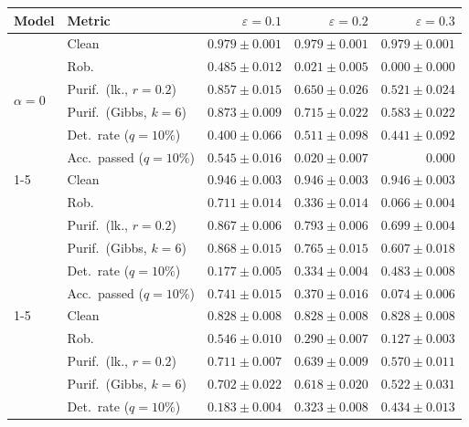 \begin{table}[htbp]
  \centering
  \small
  \begin{tabular}{@{}llrrr@{}}
    \toprule
    Model & Metric & $\varepsilon=0.1$ & $\varepsilon=0.2$ & $\varepsilon=0.3$ \\
    \midrule
    \multirow{6}{*}{$\alpha{=}0$} & Clean & $\mathbf{0.979 \pm 0.001}$ & $\mathbf{0.979 \pm 0.001}$ & $\mathbf{0.979 \pm 0.001}$ \\
     & Rob. & $0.485 \pm 0.012$ & $0.021 \pm 0.005$ & $0.000 \pm 0.000$ \\
     & Purif.\ (lk., $r{=}0.2$) & $0.857 \pm 0.015$ & $0.650 \pm 0.026$ & $0.521 \pm 0.024$ \\
     & Purif.\ (Gibbs, $k{=}6$) & $\mathbf{0.873 \pm 0.009}$ & $0.715 \pm 0.022$ & $0.583 \pm 0.022$ \\
     & Det.\ rate ($q{=}10\%$) & $0.400 \pm 0.066$ & $0.511 \pm 0.098$ & $0.441 \pm 0.092$ \\
     & Acc.\ passed ($q{=}10\%$) & $0.545 \pm 0.016$ & $0.020 \pm 0.007$ & $0.000$ \\
    \cmidrule(lr){1-5}
    \multirow{6}{*}{$\alpha{=}0.01$} & Clean & $0.946 \pm 0.003$ & $0.946 \pm 0.003$ & $0.946 \pm 0.003$ \\
     & Rob. & $0.711 \pm 0.014$ & $0.336 \pm 0.014$ & $0.066 \pm 0.004$ \\
     & Purif.\ (lk., $r{=}0.2$) & $0.867 \pm 0.006$ & $0.793 \pm 0.006$ & $0.699 \pm 0.004$ \\
     & Purif.\ (Gibbs, $k{=}6$) & $0.868 \pm 0.015$ & $\mathbf{0.765 \pm 0.015}$ & $\mathbf{0.607 \pm 0.018}$ \\
     & Det.\ rate ($q{=}10\%$) & $0.177 \pm 0.005$ & $0.334 \pm 0.004$ & $0.483 \pm 0.008$ \\
     & Acc.\ passed ($q{=}10\%$) & $0.741 \pm 0.015$ & $0.370 \pm 0.016$ & $0.074 \pm 0.006$ \\
    \cmidrule(lr){1-5}
    \multirow{6}{*}{$\alpha{=}0.1$} & Clean & $0.828 \pm 0.008$ & $0.828 \pm 0.008$ & $0.828 \pm 0.008$ \\
     & Rob. & $0.546 \pm 0.010$ & $0.290 \pm 0.007$ & $0.127 \pm 0.003$ \\
     & Purif.\ (lk., $r{=}0.2$) & $0.711 \pm 0.007$ & $0.639 \pm 0.009$ & $0.570 \pm 0.011$ \\
     & Purif.\ (Gibbs, $k{=}6$) & $0.702 \pm 0.022$ & $0.618 \pm 0.020$ & $0.522 \pm 0.031$ \\
     & Det.\ rate ($q{=}10\%$) & $0.183 \pm 0.004$ & $0.323 \pm 0.008$ & $0.434 \pm 0.013$ \\

\end{tabular}
\end{table}
